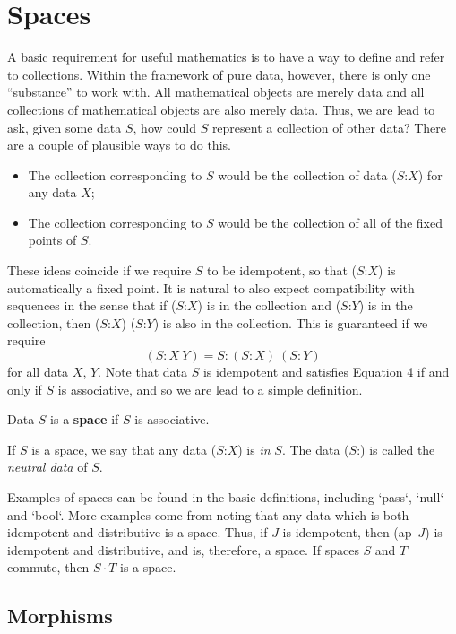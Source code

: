 \documentclass[11pt]{article}
\begin{document}
\section{Spaces}

      A basic requirement for useful mathematics is to have a way to define and refer to collections.  
Within the framework of pure data, however, there is only one ``substance'' to work with.  All mathematical objects are merely data and 
all collections of mathematical objects are also merely data.  
Thus, we are lead to ask, given some data $S$, how could $S$ represent a collection of other data?  
There are a couple of plausible ways to do this.  
\begin{itemize} 
\item The collection corresponding to $S$ would be the collection of data ($S$:$X$) for any data $X$;
\item The collection corresponding to $S$ would be the collection of all of the fixed points of $S$.  
\end{itemize}
These ideas coincide if we require $S$ to be idempotent, so that ($S$:$X$) is automatically a fixed point.  It is natural to also expect compatibility with 
sequences in the sense that if ($S$:$X$) is in the collection and ($S$:$Y$) is in the collection, then ($S$:$X$) ($S$:$Y$) is also in the collection.  
This is guaranteed if we require 
\begin{equation}
(S : X\ Y) = S : (S:X)\ (S:Y)
\end{equation}
for all data $X$, $Y$.  
Note that data $S$ is idempotent and satisfies Equation 4 if and only if $S$ is associative, and so we are lead 
to a simple definition.
\begin{definition} Data $S$ is a {\bf space} if $S$ is associative.
\end{definition}
\noindent If $S$ is a space, we say that any data ($S$:$X$) is {\it in} $S$.  
The data ($S$:) is called the {\it neutral data} of $S$.  

Examples of spaces can be found in the basic definitions, including `pass`, `null` and `bool`.  More examples come from 
noting that any data which is both idempotent and distributive is a space.  Thus, if $J$ is idempotent, then (ap\ $J$) is idempotent and 
distributive, and is, therefore, a space.  If spaces $S$ and $T$ commute, then $S\cdot T$ is a space.    

\subsection{Morphisms} 
\end{document}

